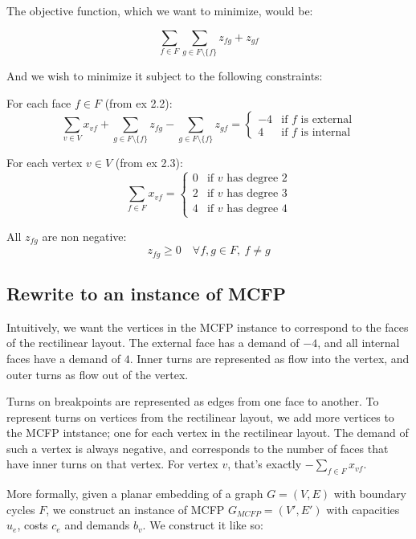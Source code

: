 The objective function, which we want to minimize, would be:

$$\sum_{f\in F} \sum_{g \in F \setminus{\{f\} }} {z_{fg} + z_{gf} }$$

And we wish to minimize it subject to the following constraints:

For each face $f \in F$ (from ex 2.2):
$$\sum_{v \in V}{x_{vf}} + \sum_{g \in F \setminus \{f\}}{z_{fg}} - \sum_{g \in F \setminus \{f\}}{z_{gf}} = \begin{cases} -4 & \text{if $f$ is external} \\ 4 & \text{if $f$ is internal}\end{cases}
$$

For each vertex $v \in V$ (from ex 2.3):
$$  \sum_{f \in F} {x_{vf}} = \begin{cases}
                                0 & \text{if $v$ has degree } 2 \\
                                2 & \text{if $v$ has degree } 3 \\
                                4 & \text{if $v$ has degree } 4
                              \end{cases}
$$

All $z_{fg}$ are non negative:
$$ z_{fg} \ge 0 \quad \forall f, g \in F, \:f\neq g $$

\subsection{Rewrite to an instance of MCFP}

Intuitively, we want the vertices in the MCFP instance to correspond to the faces of the rectilinear layout. The external face has a demand of $-4$, and all internal faces have a demand of $4$. Inner turns are represented as flow into the vertex, and outer turns as flow out of the vertex.

Turns on breakpoints are represented as edges from one face to another. To represent turns on vertices from the rectilinear layout, we add more vertices to the MCFP intstance; one for each vertex in the rectilinear layout. The demand of such a vertex is always negative, and corresponds to the number of faces that have inner turns on that vertex. For vertex $v$, that's exactly $-\sum_{f \in F}{x_{vf}}$.

More formally, given a planar embedding of a graph $G = (V, E)$ with boundary cycles $F$, we construct an instance of MCFP $G_{MCFP} = (V', E')$ with capacities $u_e$, costs $c_e$ and demands $b_v$. We construct it like so:

